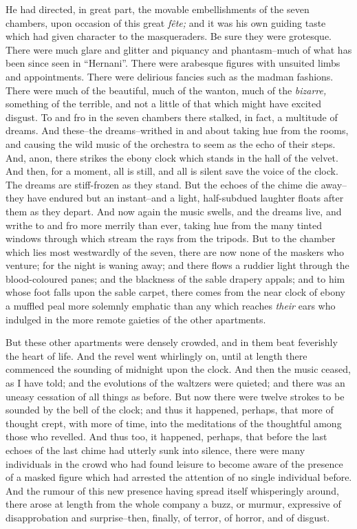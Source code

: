 \documentclass[smalldemyvopaper,14pt,twoside,onecolumn,openright,extrafontsizes,showtrims]{memoir}
\begin{document}
He had directed, in great part, the movable embellishments of the seven chambers, upon occasion of this great \textit{f\^ete;} and it was his own guiding taste which had given character to the masqueraders. Be sure they were grotesque. There were much glare and glitter and piquancy and phantasm--much of what has been since seen in ``Hernani''. There were arabesque figures with unsuited limbs and appointments. There were delirious fancies such as the madman fashions. There were much of the beautiful, much of the wanton, much of the \textit{bizarre,} something of the terrible, and not a little of that which might have excited disgust. To and fro in the seven chambers there stalked, in fact, a multitude of dreams. And these--the dreams--writhed in and about taking hue from the rooms, and causing the wild music of the orchestra to seem as the echo of their steps. And, anon, there strikes the ebony clock which stands in the hall of the velvet. And then, for a moment, all is still, and all is silent save the voice of the clock. The dreams are stiff-frozen as they stand. But the echoes of the chime die away--they have endured but an instant--and a light, half-subdued laughter floats after them as they depart. And now again the music swells, and the dreams live, and writhe to and fro more merrily than ever, taking hue from the many tinted windows through which stream the rays from the tripods. But to the chamber which lies most westwardly of the seven, there are now none of the maskers who venture; for the night is waning away; and there flows a ruddier light through the blood-coloured panes; and the blackness of the sable drapery appals; and to him whose foot falls upon the sable carpet, there comes from the near clock of ebony a muffled peal more solemnly emphatic than any which reaches \textit{their} ears who indulged in the more remote gaieties of the other apartments.

But these other apartments were densely crowded, and in them beat feverishly the heart of life. And the revel went whirlingly on, until at length there commenced the sounding of midnight upon the clock. And then the music ceased, as I have told; and the evolutions of the waltzers were quieted; and there was an uneasy cessation of all things as before. But now there were twelve strokes to be sounded by the bell of the clock; and thus it happened, perhaps, that more of thought crept, with more of time, into the meditations of the thoughtful among those who revelled. And thus too, it happened, perhaps, that before the last echoes of the last chime had utterly sunk into silence, there were many individuals in the crowd who had found leisure to become aware of the presence of a masked figure which had arrested the attention of no single individual before. And the rumour of this new presence having spread itself whisperingly around, there arose at length from the whole company a buzz, or murmur, expressive of disapprobation and surprise--then, finally, of terror, of horror, and of disgust.
\end{document}

